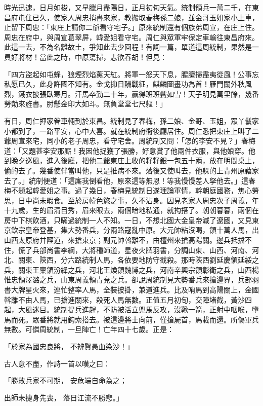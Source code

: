 時光迅速，日月如梭，又早臘月盡陽日，正月初旬天氣。統制領兵一萬二千，在東昌府屯住已久，使家人周忠捎書來家，教搬取春梅孫二娘，並金哥玉姐家小上車，止留下周忠：「東庄上請你二爺看守宅子。」原來統制還有個族弟周宣，在庄上住。周忠在府中，與周宣葛翠屏，韓愛姐看守宅。周仁與眾軍牢保定車輸往東昌府來。此這一去，不為名離故土，爭知此去少回程！有詞一篇，單道這周統制，果然是一員好將材！當此之時，中原蕩掃，志欲吞胡！但見：

「四方盜起如屯蜂，狼煙烈焰薰天紅。將軍一怒天下息，腥膻掃盡夷從風！公事忘私愿已久，此身許國不知有。金戈抑日酬戰征，麒麟圖畫功為首！雁門關外秋風烈，鐵衣披張臥寒月。汗馬卒勤二十年，贏得班班鬢如雪！天子明見萬里餘，幾番勞勣來旌書。肘懸金印大如斗。無負堂堂七尺軀！」

有日，周仁押家眷車輛到於東昌。統制見了春梅，孫二娘、金哥、玉姐，眾丫鬟家小都到了，一路平安，心中大喜。就在統制府衙後廳居住。周仁悉把東庄上叫了二爺周宣來宅，同小的老子周忠，看守宅舍。周統制又問：「怎的李安不見？」春梅道：「又題甚李安那廝！我因他捉獲了張勝，好意賞了他兩件衣服，與他娘穿。他到晚夕巡風，進入後廳，把他二爺東庄上收的籽籽銀一包五十兩，放在明間桌上，偷的去了。幾番使伴當叫他，只是推病不來。落後又使叫去，他躲的上青州原藉家去了。」統制便道：「這廝我倒看他，原來這等無恩！等我慢慢差人拏他去。」這春梅不題起韓愛姐之事。過了幾日，春梅見統制日遂理論軍情，幹朝庭國務，焦心勞思，日中尚未暇食。至於房幃色慾之事，久不沾身。因見老家人周忠次子周義，年十九歲，生的眉清目秀，眉來眼去，兩個暗地私通，就抅搭了。朝朝暮暮，兩個在房中下棋飲酒，只瞞過統制一人不知。一日，不想北國大金皇帝滅了遼國，又見東京欽宗皇帝登基，集大勢番兵，分兩路寇亂中原。大元帥粘沒喝，領十萬人馬，出山西太原府井陘道，來搶東京；副元帥斡離不，由檀州來搶高陽關。邊兵抵擋不住，慌了兵部尚書李綱，大將種師道，星夜火牌羽書，分調山東、山西、河南、河北、關東、陝西，分六路統制人馬，各依要地防守截殺。那時陝西劉延慶領延綏之兵，關東王稟領汾絳之兵，河北王煥領魏博之兵，河南辛興宗領彰衛之兵，山西楊惟忠領澤潞之兵，山東周義領青兗之兵。卻說周統制見大勢番兵來搶邊界，兵部羽書大牌星火來，連忙整率人馬，全裝披掛，兼道進兵。比及哨馬到高陽關上，金國斡離不由人馬，已搶進關來，殺死人馬無數。正值五月初旬，交陣堵截，黃沙四起，大風迷目。統制提兵進趕，不防被活立兜馬反攻，沒鞦一箭，正射中咽喉，墮馬而死。眾番將就用鈎索搭去。被這邊將士向前，僅搶屍首，馬載而還。所傷軍兵無數。可憐周統制，一旦陣亡！亡年四十七歲。正是：

「於家為國忠良將，  不辨賢愚血染沙！」

古人意不盡，作詩一首以嘆之曰：

「勝敗兵家不可期，  安危端自命為之；

出師未捷身先喪，  落日江流不勝悲。」

